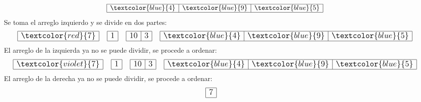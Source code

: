 \documentclass{article}
\begin{document}
\begin{minipage}{0.5\textwidth}
\begin{equation*}
\begin{array}{|r|r|r|}
      \hline \textcolor{blue}{4} & \textcolor{blue}{9} & \textcolor{blue}{5} \\ \hline
    \end{array}
  \end{equation*}
  Se toma el arreglo izquierdo y se divide en dos partes:
  \begin{equation*}
    \large
    \begin{array}{|r|}
      \hline \textcolor{red}{7} \\ \hline
    \end{array} \quad 
    \begin{array}{|r|}
      \hline 1 \\ \hline
    \end{array} \quad 
    \begin{array}{|r|r|}
      \hline 10 & 3 \\ \hline
    \end{array}\quad 
    \begin{array}{|r|r|r|}
      \hline \textcolor{blue}{4} & \textcolor{blue}{9} & \textcolor{blue}{5} \\ \hline
    \end{array}
  \end{equation*}
  El arreglo de la izquierda ya no se puede dividir, se procede a ordenar:
  \begin{equation*}
    \large
    \begin{array}{|r|}
      \hline \textcolor{violet}{7} \\ \hline
    \end{array} \quad 
    \begin{array}{|r|}
      \hline 1 \\ \hline
    \end{array} \quad 
    \begin{array}{|r|r|}
      \hline 10 & 3 \\ \hline
    \end{array}\quad 
    \begin{array}{|r|r|r|}
      \hline \textcolor{blue}{4} & \textcolor{blue}{9} & \textcolor{blue}{5} \\ \hline
    \end{array}
  \end{equation*}
  El arreglo de la derecha ya no se puede dividir, se procede a ordenar:
  \begin{equation*}
    \large
    \begin{array}{|r|}
      \hline 7 \\ \hline
    \end{array} \quad 

\end{equation*}
\end{minipage}
\end{document}
